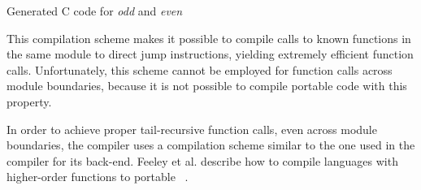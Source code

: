 \begin{Program}
{
}
\caption{Generated C code for {\em odd} and {\em even}}
\label{prog:c-odd-even}
\end{Program}

This compilation scheme makes it possible to compile calls to known
functions in the same module to direct jump instructions, yielding
extremely efficient function calls.  Unfortunately, this scheme cannot
be employed for function calls across module boundaries, because it is
not possible to compile portable \cee{} code with this property.

%
In order to achieve proper tail-recursive function calls, even across
module boundaries, the \turtle{} compiler uses a compilation scheme
similar to the one used in the \gambit{} \scheme{} compiler for its
\cee{} back-end.  Feeley et al.  describe how to compile languages
with higher-order functions to portable
\cee{}~\cite{feeley97compilingtoc}.

